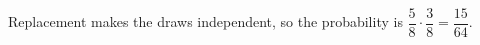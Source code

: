 Replacement makes the draws independent, so the probability is $\dfrac{5}{8}\cdot\dfrac{3}{8}=\boxed{\dfrac{15}{64}}$.
